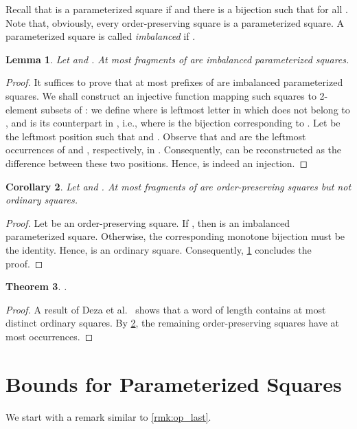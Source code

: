 \documentclass{article}
\theoremstyle{plain}
\newtheorem{theorem}{Theorem}[section]
\newtheorem{lemma}[theorem]{Lemma}
\newtheorem{corollary}[theorem]{Corollary}
\theoremstyle{definition}
\theoremstyle{remark}
\begin{document}
  Recall that  is a parameterized square
  if  and there is a bijection  such that
   for all .
  Note that, obviously, every order-preserving square is a parameterized square.
  A parameterized square  is called \emph{imbalanced} if .

  \begin{lemma}\label{lem:imbalanced}
  Let  and .
  At most  fragments of  are imbalanced parameterized squares.
  \end{lemma}
  \begin{proof}
    It suffices to prove that at most  prefixes of  are imbalanced parameterized squares.
  We shall construct an injective function  mapping such squares to 2-element subsets of :
  we define  where  is leftmost letter in  which does not belong to , and  is its counterpart in ,
  i.e.,  where  is the bijection corresponding to .
  Let  be the leftmost position such that  and .
  Observe that  and 
  are the leftmost occurrences of  and , respectively, in . Consequently,  can be reconstructed
  as the difference between these two positions. Hence,  is indeed an injection.
  \end{proof}
  
  \begin{corollary}\label{cor:op}
  Let  and . At most  fragments of 
  are order-preserving squares but not ordinary squares.
  \end{corollary}
  \begin{proof}
  Let  be an order-preserving square. If , then  is an imbalanced
  parameterized square. Otherwise, the corresponding monotone bijection  must be the identity.
  Hence,  is an ordinary square. Consequently, \cref{lem:imbalanced} concludes the proof.
  \end{proof}
  
  \begin{theorem}\label{thm:op}
  .
  \end{theorem}
  \begin{proof}
  A result of Deza et al.~\cite{DBLP:journals/dam/DezaFT15} shows that a word of length  contains
  at most  distinct ordinary squares.
  By \cref{cor:op}, the remaining order-preserving squares have at most  occurrences.
  \end{proof}

  
  \section{Bounds for Parameterized Squares}\label{sec:param}
  We start with a remark similar to \cref{rmk:op_last}.
\end{document}

